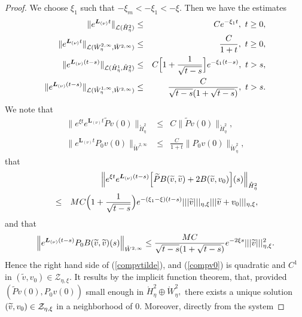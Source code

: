 \documentclass[10pt,a4paper]{amsart}
\begin{document}
\begin{proof}
We choose $\xi_1$ such that $- \xi_m <  - \xi_1 < -  \xi$.
Then we have the estimates%
\begin{eqnarray*}
\|e^{\boldsymbol{L}_{(\nu )}t}\|_{\mathcal{L}(\mathring{H}_{\eta}^{2})} &\leq
&Ce^{-\xi _{1}t},\text{ }t\geq 0, \\
\|e^{\boldsymbol{L}_{(\nu )}t}\|_{\mathcal{L}(\mathring{W}_{\eta}^{2,\infty },%
\mathring{W}^{2,\infty })} &\leq &\frac{C}{1+t},\text{ }t\geq 0, \\
\|e^{\boldsymbol{L}_{(\nu )}(t-s)}\|_{\mathcal{L}(\mathring{H}_{\eta}^{1},%
\mathring{H}_{\eta}^{2})} &\leq &C \Bigl[1+\frac{1}{\sqrt{t-s}} \Bigr] e^{-\xi_{1}(t-s)},\text{ }t>s, \\
\|e^{\boldsymbol{L}_{(\nu )}(t-s)}\|_{\mathcal{L}(\mathring{W}_{\eta}^{1,\infty
},\mathring{W}^{2,\infty })} &\leq &\frac{C}{\sqrt{t-s}(1 + \sqrt{t-s})},\text{ }t>s.
\end{eqnarray*}%
We note that%
\begin{eqnarray*}
\|e^{\xi t}e^{\boldsymbol{L}_{(\nu )}t}\widetilde{P}v(0)\|_{\mathring{H}%
_{\eta}^{2}} &\leq &C\|\widetilde{P}v(0)\|_{\mathring{H}_{\eta}^{2}}, \\
\|e^{\boldsymbol{L}_{(\nu )}t}P_{0}v(0)\|_{\mathring{W}^{2,\infty }} &\leq &%
\frac{C}{1+t}\|P_{0}v(0)\|_{\mathring{W}_{\eta}^{2}},
\end{eqnarray*}%
that
\begin{eqnarray*}
&&\Bigl\|e^{\xi t}e^{\boldsymbol{L}_{(\nu )}(t-s)} \Bigl[\widetilde{P}B(\widetilde{v}%
,\widetilde{v})+2B(\widetilde{v},v_{0})\Bigr](s)\Bigr\|_{\mathring{H}_{\eta}^{2}} \\
&\leq &MC \Bigl(1+\frac{1}{\sqrt{t-s}} \Bigr)e^{-(\xi _{1}-\xi )(t-s)}|||%
\widetilde{v}|||_{\eta,\xi }|||\widetilde{v}+v_{0}|||_{\eta,\xi },
\end{eqnarray*}%
and that 
\begin{equation*}
\Bigl\|e^{\boldsymbol{L}_{(\nu )}(t-s)}P_{0}B(\widetilde{v},\widetilde{v})(s) \Bigr\|_{%
\mathring{W}^{2,\infty }}\leq \frac{MC}{\sqrt{t-s} (1 + \sqrt{t-s})}e^{-2\xi s}|||%
\widetilde{v}|||_{\eta,\xi }^{2}.
\end{equation*}%
Hence the right hand side of (\ref{compvtilde}), and (\ref{compv0}) is
quadratic and $C^{1}$ in $(\widetilde{v},v_{0})\in \mathcal{Z}_{\eta,\xi }.$
It results by the implicit function theorem, that, provided $(\widetilde{P}%
v(0),P_{0}v(0))$ small enough in $\mathring{H}_{\eta}^{2}\oplus \mathring{W}%
_{\eta}^{2},$ there exists a unique solution $(\widetilde{v},v_{0})\in \mathcal{%
Z}_{\eta,\xi}$ in a neighborhood of $0.$ Moreover, directly from the system

\end{proof}
\end{document}
